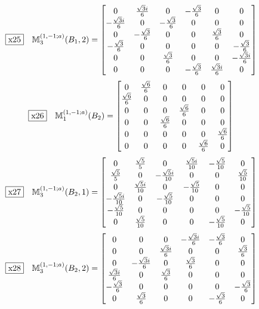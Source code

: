 \documentclass[fleqn,10pt,landscape]{jsarticle}
\begin{document}
\begin{dmath*}
\fbox{x25}\quad \mathbb{M}_{3}^{(1,-1;a)}(B_{1},2)=\begin{bmatrix} 0 & \frac{\sqrt{3} i}{6} & 0 & - \frac{\sqrt{3}}{6} & 0 & 0 \\ - \frac{\sqrt{3} i}{6} & 0 & - \frac{\sqrt{3}}{6} & 0 & 0 & 0 \\ 0 & - \frac{\sqrt{3}}{6} & 0 & 0 & \frac{\sqrt{3}}{6} & 0 \\ - \frac{\sqrt{3}}{6} & 0 & 0 & 0 & 0 & - \frac{\sqrt{3}}{6} \\ 0 & 0 & \frac{\sqrt{3}}{6} & 0 & 0 & - \frac{\sqrt{3} i}{6} \\ 0 & 0 & 0 & - \frac{\sqrt{3}}{6} & \frac{\sqrt{3} i}{6} & 0 \end{bmatrix}
\end{dmath*}
\begin{dmath*}
\fbox{x26}\quad \mathbb{M}_{1}^{(1,-1;a)}(B_{2})=\begin{bmatrix} 0 & \frac{\sqrt{6}}{6} & 0 & 0 & 0 & 0 \\ \frac{\sqrt{6}}{6} & 0 & 0 & 0 & 0 & 0 \\ 0 & 0 & 0 & \frac{\sqrt{6}}{6} & 0 & 0 \\ 0 & 0 & \frac{\sqrt{6}}{6} & 0 & 0 & 0 \\ 0 & 0 & 0 & 0 & 0 & \frac{\sqrt{6}}{6} \\ 0 & 0 & 0 & 0 & \frac{\sqrt{6}}{6} & 0 \end{bmatrix}
\end{dmath*}
\begin{dmath*}
\fbox{x27}\quad \mathbb{M}_{3}^{(1,-1;a)}(B_{2},1)=\begin{bmatrix} 0 & \frac{\sqrt{5}}{5} & 0 & \frac{\sqrt{5} i}{10} & - \frac{\sqrt{5}}{10} & 0 \\ \frac{\sqrt{5}}{5} & 0 & - \frac{\sqrt{5} i}{10} & 0 & 0 & \frac{\sqrt{5}}{10} \\ 0 & \frac{\sqrt{5} i}{10} & 0 & - \frac{\sqrt{5}}{10} & 0 & 0 \\ - \frac{\sqrt{5} i}{10} & 0 & - \frac{\sqrt{5}}{10} & 0 & 0 & 0 \\ - \frac{\sqrt{5}}{10} & 0 & 0 & 0 & 0 & - \frac{\sqrt{5}}{10} \\ 0 & \frac{\sqrt{5}}{10} & 0 & 0 & - \frac{\sqrt{5}}{10} & 0 \end{bmatrix}
\end{dmath*}
\begin{dmath*}
\fbox{x28}\quad \mathbb{M}_{3}^{(1,-1;a)}(B_{2},2)=\begin{bmatrix} 0 & 0 & 0 & - \frac{\sqrt{3} i}{6} & - \frac{\sqrt{3}}{6} & 0 \\ 0 & 0 & \frac{\sqrt{3} i}{6} & 0 & 0 & \frac{\sqrt{3}}{6} \\ 0 & - \frac{\sqrt{3} i}{6} & 0 & \frac{\sqrt{3}}{6} & 0 & 0 \\ \frac{\sqrt{3} i}{6} & 0 & \frac{\sqrt{3}}{6} & 0 & 0 & 0 \\ - \frac{\sqrt{3}}{6} & 0 & 0 & 0 & 0 & - \frac{\sqrt{3}}{6} \\ 0 & \frac{\sqrt{3}}{6} & 0 & 0 & - \frac{\sqrt{3}}{6} & 0 \end{bmatrix}
\end{dmath*}
\end{document}
